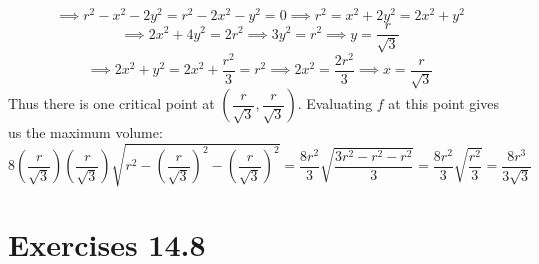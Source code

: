 \documentclass[12pt]{article}
\newcommand{\parns}[1]{\left(#1\right)}
\begin{document}
\begin{itemize}
    \pagebreak
    \[\implies r^2-x^2-2y^2=r^2-2x^2-y^2=0\implies r^2=x^2+2y^2=2x^2+y^2\]
    \[\implies 2x^2+4y^2=2r^2\implies 3y^2=r^2\implies y=\frac{r}{\sqrt{3}} \]
    \[\implies 2x^2+y^2=2x^2+\frac{r^2}{3}=r^2\implies2x^2=\frac{2r^2}{3}\implies x=\frac{r}{\sqrt3}\]
    Thus there is one critical point at $\parns{\dfrac{r}{\sqrt3},\dfrac{r}{\sqrt3}}$. Evaluating $f$ at this point gives us the maximum volume:
    \[8\parns{\frac{r}{\sqrt3}}\parns{\frac{r}{\sqrt3}}\sqrt{r^2-\parns{\frac{r}{\sqrt3}}^2-\parns{\frac{r}{\sqrt3}}^2}=\frac{8r^2}{3}\sqrt{\frac{3r^2-r^2-r^2}{3}}=\frac{8r^2}{3}\sqrt{\frac{r^2}{3}}=\frac{8r^3}{3\sqrt3}\]


\end{itemize}
\section*{Exercises 14.8}
\end{document}
